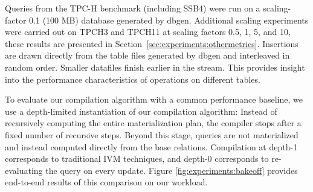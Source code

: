 Queries from the TPC-H benchmark (including SSB4) were run on a scaling-factor 0.1 (100 MB) database generated by dbgen\cite{counciltpc}.  Additional scaling experiments were carried out on TPCH3 and TPCH11 at scaling factors 0.5, 1, 5, and 10, these results are presented in Section~\ref{sec:experiments:othermetrics}.  Insertions are drawn directly from the table files generated by dbgen and interleaved in random order.  Smaller datafiles finish earlier in the stream.  This provides insight into the performance characteristics of operations on different tables.


To evaluate our compilation algorithm with a common performance baseline, we use a depth-limited instantiation of our compilation algorithm: Instead of recursively computing the entire materialization plan, the compiler stops after a fixed number of recursive steps.  Beyond this stage, queries are not materialized and instead computed directly from the base relations.   Compilation at depth-1 corresponds to traditional IVM techniques, and depth-0 corresponds to re-evaluating the query on every update.  Figure \ref{fig:experiments:bakeoff} provides end-to-end results of this comparison on our workload.


